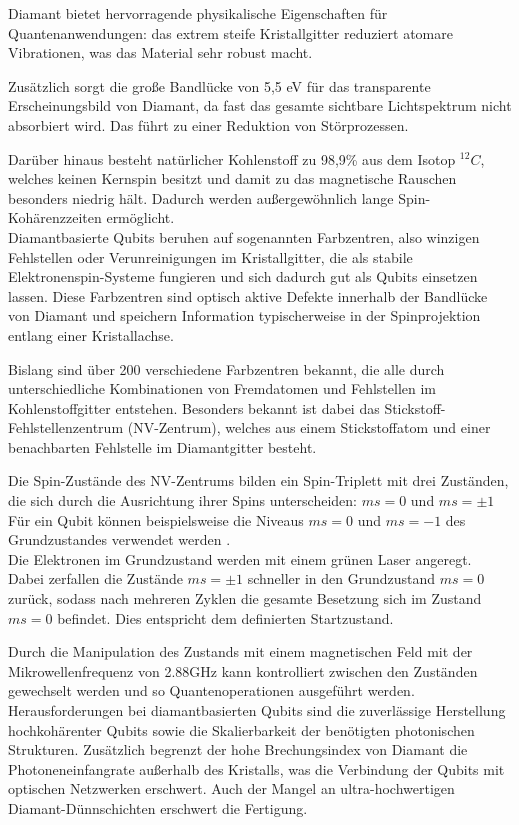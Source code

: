 Diamant bietet hervorragende physikalische Eigenschaften für Quantenanwendungen: das extrem steife Kristallgitter reduziert atomare Vibrationen, was das Material sehr robust macht. 


Zusätzlich sorgt die große Bandlücke von 5,5 eV für das transparente Erscheinungsbild von Diamant, da fast das gesamte sichtbare Lichtspektrum nicht absorbiert wird. Das führt zu einer Reduktion von Störprozessen.


Darüber hinaus besteht natürlicher Kohlenstoff zu 98,9\% aus dem Isotop ${}^{12}C$, welches keinen Kernspin besitzt und damit zu das magnetische Rauschen besonders niedrig hält. Dadurch werden außergewöhnlich lange Spin-Kohärenzzeiten ermöglicht. \\

Diamantbasierte Qubits beruhen auf sogenannten Farbzentren, also winzigen Fehlstellen oder Verunreinigungen im Kristallgitter, die als stabile Elektronenspin-Systeme fungieren und sich dadurch gut als Qubits einsetzen lassen. Diese Farbzentren sind optisch aktive Defekte innerhalb der Bandlücke von Diamant und speichern Information typischerweise in der Spinprojektion entlang einer Kristallachse. 


Bislang sind über 200 verschiedene Farbzentren bekannt, die alle durch unterschiedliche Kombinationen von Fremdatomen und Fehlstellen im Kohlenstoffgitter entstehen. Besonders bekannt ist dabei das Stickstoff-Fehlstellenzentrum (NV-Zentrum), welches aus einem Stickstoffatom und einer benachbarten Fehlstelle im Diamantgitter besteht. 


Die Spin-Zustände des NV-Zentrums bilden ein Spin-Triplett mit drei Zuständen, die sich durch die Ausrichtung ihrer Spins unterscheiden: $ms = 0$ und $ms = \pm 1$
Für ein Qubit können beispielsweise die Niveaus $ms = 0$ und $ms = -1$ des Grundzustandes verwendet werden . \\
Die Elektronen im Grundzustand werden mit einem grünen Laser angeregt. Dabei zerfallen die Zustände $ms = \pm 1$ schneller in den Grundzustand $ms=0$ zurück, sodass nach mehreren Zyklen die gesamte Besetzung sich im Zustand $ms=0$ befindet. Dies entspricht dem definierten Startzustand. 


Durch die Manipulation des Zustands mit einem magnetischen Feld mit der Mikrowellenfrequenz von 2.88GHz kann kontrolliert zwischen den Zuständen gewechselt werden und so Quantenoperationen ausgeführt werden. \\

Herausforderungen  bei diamantbasierten Qubits sind die zuverlässige Herstellung hochkohärenter Qubits sowie die Skalierbarkeit der benötigten photonischen Strukturen. Zusätzlich begrenzt der hohe Brechungsindex von Diamant die Photoneneinfangrate außerhalb des Kristalls, was die Verbindung der Qubits mit optischen Netzwerken erschwert. Auch der Mangel an ultra-hochwertigen Diamant-Dünnschichten erschwert die Fertigung. \\

